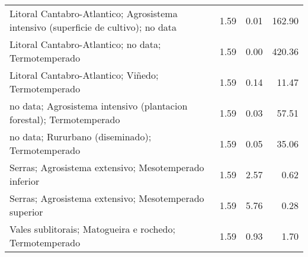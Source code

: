 \begin{table}[p]
\begin{tabular}{lrrr}
  Litoral Cantabro-Atlantico; Agrosistema intensivo (superficie de cultivo); no data & 1.59 & 0.01 & 162.90 \\ 
  Litoral Cantabro-Atlantico; no data; Termotemperado & 1.59 & 0.00 & 420.36 \\ 
  Litoral Cantabro-Atlantico; Viñedo; Termotemperado & 1.59 & 0.14 & 11.47 \\ 
  no data; Agrosistema intensivo (plantacion forestal); Termotemperado & 1.59 & 0.03 & 57.51 \\ 
  no data; Rururbano (diseminado); Termotemperado & 1.59 & 0.05 & 35.06 \\ 
  Serras; Agrosistema extensivo; Mesotemperado inferior & 1.59 & 2.57 & 0.62 \\ 
  Serras; Agrosistema extensivo; Mesotemperado superior & 1.59 & 5.76 & 0.28 \\ 
  Vales sublitorais; Matogueira e rochedo; Termotemperado & 1.59 & 0.93 & 1.70 \\ 
   \hline
\end{tabular}
\end{table}
